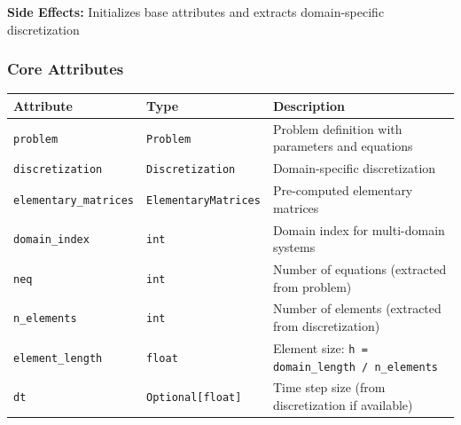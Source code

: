 \textbf{Side Effects:} Initializes base attributes and extracts domain-specific discretization

\subsubsection{Core Attributes}

\begin{longtable}{|p{3.8cm}|p{3.5cm}|p{7cm}|}
\hline
\textbf{Attribute} & \textbf{Type} & \textbf{Description} \\
\hline
\endhead

\texttt{problem} & \texttt{Problem} & Problem definition with parameters and equations \\
\hline

\texttt{discretization} & \texttt{Discretization} & Domain-specific discretization \\
\hline

\texttt{elementary\_matrices} & \texttt{ElementaryMatrices} & Pre-computed elementary matrices \\
\hline

\texttt{domain\_index} & \texttt{int} & Domain index for multi-domain systems \\
\hline

{\color{gray}  \texttt{neq}} & {\color{gray}   \texttt{int} }& {\color{gray} Number of equations (extracted from problem)} \\
\hline

{\color{gray}  \texttt{n\_elements}  }& {\color{gray}  \texttt{int}  }& {\color{gray}  Number of elements (extracted from discretization) } \\
\hline

{\color{gray}   \texttt{element\_length}  }&{\color{gray}   \texttt{float}  }& {\color{gray}  Element size: \texttt{h = domain\_length / n\_elements}  }\\
\hline

{\color{gray}   \texttt{dt}  }&{\color{gray}   \texttt{Optional[float]}  }& {\color{gray} Time step size (from discretization if available)} \\
\hline

\end{longtable}

